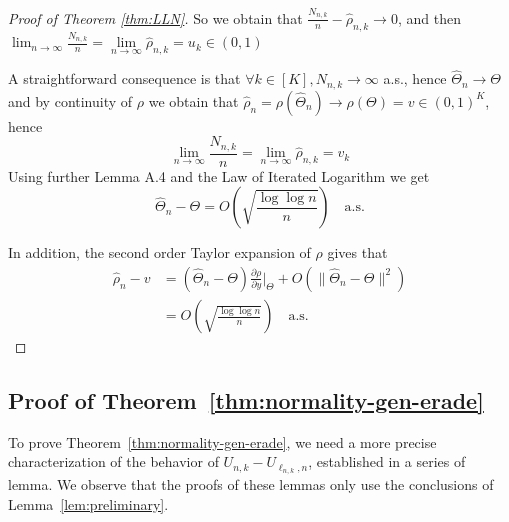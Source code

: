 \begin{proof}[Proof of Theorem \ref{thm:LLN}]
	So we obtain that \(\frac{N_{n,k}}{n} - \hat{\rho}_{n,k} \to 0\),  and then \(\lim_{n \to \infty} \frac{N_{n,k}}{n} = \lim\limits_{n \to \infty} \hat{\rho}_{n,k} = u_k \in (0,1)\)
	
	A straightforward consequence is that $\forall k \in [K], N_{n,k} \to \infty$ a.s., hence $\hat{\Theta}_n \to \Theta$ and by continuity of \(\rho\) we obtain that \(\hat{\rho}_n = \rho(\hat{\Theta}_n) \to \rho(\Theta) = v \in (0,1)^K\), hence
	\[
	\lim_{n \to \infty} \frac{N_{n,k}}{n} = \lim_{n \to \infty} \hat{\rho}_{n,k} = v_k
	\]
	Using further Lemma A.4 \cite{hu2004asymptotic} and the Law of Iterated Logarithm we get
	\[
	\hat{\Theta}_n - \Theta = O\left(\sqrt{\frac{\log\!\log n}{n}}\right) \quad \text{a.s.}
	\]
	
	In addition, the second order Taylor expansion of \(\rho\)  gives that
	\begin{align*}
		\hat{\rho}_n - v  &= (\hat{\Theta}_n-\Theta)\frac{\partial \rho}{\partial y}\Big|_{\Theta} + O(\|\hat{\Theta}_n-\Theta\|^2) \\
		&= O\left(\sqrt{\frac{\log\!\log n}{n}}\right) \quad \text{a.s.}
	\end{align*}
	
\end{proof}

\subsection{Proof of Theorem~\ref{thm:normality-gen-erade}}\label{proof:thm2}To prove Theorem~\ref{thm:normality-gen-erade}, we need a more precise characterization of the behavior of $U_{n,k} - U_{\ell_{n,k},n}$, established in a series of lemma. We observe that the proofs of these lemmas only use the conclusions of Lemma~\ref{lem:preliminary}.

